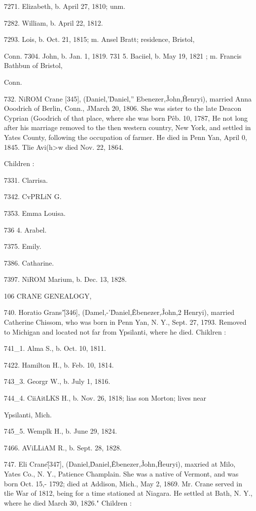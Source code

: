 7271. Elizabeth, b. April 27, 1810; unm. 

7282. William, b. April 22, 1812. 

7293. Lois, b. Oct. 21, 1815; m. Ansel Bratt; residence, Bristol, 

Conn. 
7304. John, b. Jan. 1, 1819. 
731  5. Baciiel, b. May 19, 1821 ; m. Francis Bathbun of Bristol, 

Conn. 

732. NiROM Crane [345], (Daniel,'\^ Daniel,'' Ebenezer,\^ 
John,\^ Henryi), married Anna Ooodrich of Berlin, Conn., JMarch 
20, 1806. She was sister to the late Deacon Cyprian (Goodrich 
of that place, where she was born P\^eb. 10, 1787, He not long 
after his marriage removed to the then western country, New 
York, and settled in Yates County, following the occupation of 
farmer. He died in Penn Yan, April 0, 1845. Tlie Avi(h>w died 
Nov. 22, 1864. 

Children : 

7331. Clarrisa. 

7342. CvPRLiN G. 

7353. Emma Louisa. 

736  4. Arabel. 

7375. Emily. 

7386. Catharine. 

7397. NiROM Marium, b. Dec. 13, 1828. 



106 CRANE GENEALOGY, 

740. Horatio Grans'\^ [346], (Damel,-'\^ Daniel,\^ Ebenezer,\^ 
John,2 Henryi), married Catherine Chissom, who was born in 
Penn Yan, N. Y., Sept. 27, 1793. Removed to Michigan and 
located not far from Ypsilanti, where he died. Chiklren : 

741\_1. Alma S., b. Oct. 10, 1811. 

7422. Hamilton H., b. Feb. 10, 1814. 

743\_3. Georgr W., b. July 1, 1816. 

744\_4. CiiAitLKS H., b. Nov. 26, 1818; lias son Morton; lives near 

Ypsilanti, Mich. 

745\_5. Wemplk H., b. June 29, 1824. 

7466. AViLLiAM R., b. Sept. 28, 1828. 

747. Eli Crane\^ [347], (Daniel,\^ Daniel,\^ Ebenezer,\^ John,\^ 
Heuryi), maxried at Milo, Yates Co., N. Y., Patience Champlain. 
She was a native of Vermont, and was born Oct. 15,- 1792; died 
at Addison, Mich., May 2, 1869. Mr. Crane served in tlie War 
of 1812, being for a time stationed at Niagara. He settled at 
Bath, N. Y., where he died March 30, 1826." Children : 

